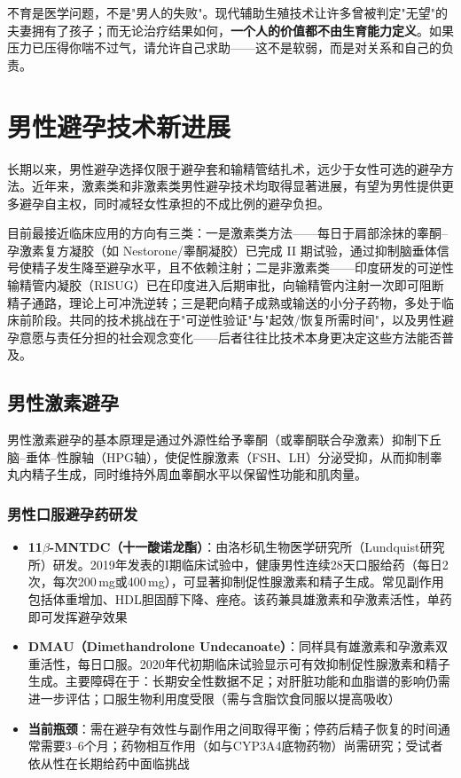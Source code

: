 \begin{tcolorbox}[colback=pink!5!white,colframe=red!50!black,title=贴心小叮咛]
不育是医学问题，不是"男人的失败"。现代辅助生殖技术让许多曾被判定"无望"的夫妻拥有了孩子；而无论治疗结果如何，\textbf{一个人的价值都不由生育能力定义}。如果压力已压得你喘不过气，请允许自己求助——这不是软弱，而是对关系和自己的负责。
\end{tcolorbox}


\section{男性避孕技术新进展}

长期以来，男性避孕选择仅限于避孕套和输精管结扎术，远少于女性可选的避孕方法。近年来，激素类和非激素类男性避孕技术均取得显著进展，有望为男性提供更多避孕自主权，同时减轻女性承担的不成比例的避孕负担。


目前最接近临床应用的方向有三类：一是激素类方法——每日于肩部涂抹的睾酮--孕激素复方凝胶（如 Nestorone/睾酮凝胶）已完成 II 期试验，通过抑制脑垂体信号使精子发生降至避孕水平，且不依赖注射；二是非激素类——印度研发的可逆性输精管内凝胶（RISUG）已在印度进入后期审批，向输精管内注射一次即可阻断精子通路，理论上可冲洗逆转；三是靶向精子成熟或输送的小分子药物，多处于临床前阶段。共同的技术挑战在于"可逆性验证"与"起效/恢复所需时间"，以及男性避孕意愿与责任分担的社会观念变化——后者往往比技术本身更决定这些方法能否普及。

\subsection{男性激素避孕}

男性激素避孕的基本原理是通过外源性给予睾酮（或睾酮联合孕激素）抑制下丘脑--垂体--性腺轴（HPG轴），使促性腺激素（FSH、LH）分泌受抑，从而抑制睾丸内精子生成，同时维持外周血睾酮水平以保留性功能和肌肉量。

\subsubsection{男性口服避孕药研发}

\begin{itemize}[leftmargin=2cm]
	\item \textbf{11$\beta$-MNTDC（十一酸诺龙酯）}：由洛杉矶生物医学研究所（Lundquist研究所）研发。2019年发表的I期临床试验中，健康男性连续28天口服给药（每日2次，每次200\,mg或400\,mg），可显著抑制促性腺激素和精子生成。常见副作用包括体重增加、HDL胆固醇下降、痤疮。该药兼具雄激素和孕激素活性，单药即可发挥避孕效果
	\item \textbf{DMAU（Dimethandrolone Undecanoate）}：同样具有雄激素和孕激素双重活性，每日口服。2020年代初期临床试验显示可有效抑制促性腺激素和精子生成。主要障碍在于：长期安全性数据不足；对肝脏功能和血脂谱的影响仍需进一步评估；口服生物利用度受限（需与含脂饮食同服以提高吸收）
	\item \textbf{当前瓶颈}：需在避孕有效性与副作用之间取得平衡；停药后精子恢复的时间通常需要3--6个月；药物相互作用（如与CYP3A4底物药物）尚需研究；受试者依从性在长期给药中面临挑战
\end{itemize}

